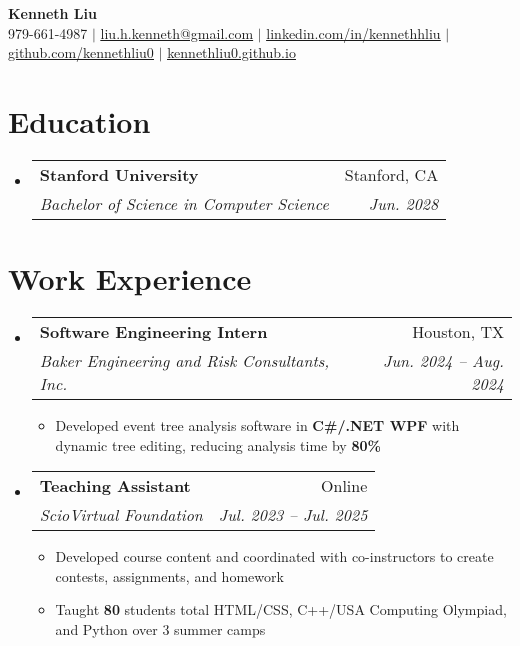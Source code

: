 \documentclass[letterpaper,11pt]{article}
\makeatletter
\newcommand{\resumeItem}[1]{
  \item\small{
    {#1 \vspace{-2pt}}
  }
}
\newcommand{\resumeSubheading}[4]{
  \vspace{-2pt}\item
    \begin{tabular*}{0.97\textwidth}[t]{l@{\extracolsep{\fill}}r}
      \textbf{#1} & #2 \\
      \textit{\small#3} & \textit{\small #4} \\
    \end{tabular*}\vspace{-7pt}
}
\newcommand{\resumeSubHeadingListStart}{\begin{itemize}[leftmargin=0.15in, label={}]}
\newcommand{\resumeSubHeadingListEnd}{\end{itemize}}
\newcommand{\resumeItemListStart}{\begin{itemize}}
\newcommand{\resumeItemListEnd}{\end{itemize}\vspace{-5pt}}
\makeatother
\begin{document}

\begin{center}
    \textbf{\Huge  Kenneth Liu} \\ \vspace{1pt}
    \small 979-661-4987 $|$ \href{mailto:liu.h.kenneth@gmail.com}{\underline{liu.h.kenneth@gmail.com}} $|$ 
    \href{https://www.linkedin.com/in/kennethhliu}{\underline{linkedin.com/in/kennethhliu}}
    $|$ 
    \href{https://github.com/kennethliu0}{\underline{github.com/kennethliu0}} $|$ \href{https://kennethliu0.github.io}{\underline{kennethliu0.github.io}}
\end{center}


\section{Education}
  \resumeSubHeadingListStart
    \resumeSubheading
      {Stanford University}{Stanford, CA}
      {Bachelor of Science in Computer Science}{Jun. 2028}
  \resumeSubHeadingListEnd


\section{Work Experience}
  \resumeSubHeadingListStart
     \resumeSubheading
      {Software Engineering Intern}{Houston, TX}
      {Baker Engineering and Risk Consultants, Inc.}{Jun. 2024 -- Aug. 2024}
      \resumeItemListStart
        \resumeItem{Developed event tree analysis software in \textbf{C\#/.NET WPF} with dynamic tree editing, reducing analysis time by \textbf{80\%}}
      \resumeItemListEnd
    \resumeSubheading
      {Teaching Assistant}{Online}
      {ScioVirtual Foundation}{Jul. 2023 -- Jul. 2025}
      \resumeItemListStart
        \resumeItem{Developed course content and coordinated with co-instructors to create contests, assignments, and homework}
        \resumeItem{Taught \textbf{80} students total HTML/CSS, C++/USA Computing Olympiad, and Python over 3 summer camps}
      \resumeItemListEnd
  \resumeSubHeadingListEnd
\end{document}
